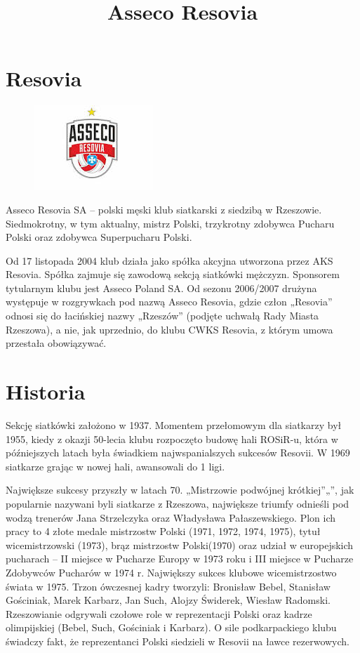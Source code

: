 \documentclass{article}
\title{Asseco Resovia}
\begin{document}
\maketitle    
\tableofcontents    
\newpage
                
\section{Resovia}
\label{obrazek}
\begin{figure}
\centering
\includegraphics{resovia.jpg}

\end{figure}

    Asseco Resovia SA – polski męski klub siatkarski z siedzibą w Rzeszowie. Siedmokrotny, w tym aktualny, mistrz Polski, trzykrotny zdobywca Pucharu Polski oraz zdobywca Superpucharu Polski.

Od 17 listopada 2004 klub działa jako spółka akcyjna utworzona przez AKS Resovia. Spółka zajmuje się zawodową sekcją siatkówki mężczyzn. Sponsorem tytularnym klubu jest Asseco Poland SA. Od sezonu 2006/2007 drużyna występuje w rozgrywkach pod nazwą Asseco Resovia, gdzie człon „Resovia” odnosi się do łacińskiej nazwy „Rzeszów” (podjęte uchwałą Rady Miasta Rzeszowa), a nie, jak uprzednio, do klubu CWKS Resovia, z którym umowa przestała obowiązywać.

\section{Historia}
Sekcję siatkówki założono w 1937. Momentem przełomowym dla siatkarzy był 1955, kiedy z okazji 50-lecia klubu rozpoczęto budowę hali ROSiR-u, która w późniejszych latach była świadkiem najwspanialszych sukcesów Resovii. W 1969 siatkarze grając w nowej hali, awansowali do 1 ligi.

Największe sukcesy przyszły w latach 70. „Mistrzowie podwójnej krótkiej”„”, jak popularnie nazywani byli siatkarze z Rzeszowa, największe triumfy odnieśli pod wodzą trenerów Jana Strzelczyka oraz Władysława Pałaszewskiego. Plon ich pracy to 4 złote medale mistrzostw Polski (1971, 1972, 1974, 1975), tytuł wicemistrzowski (1973), brąz mistrzostw Polski(1970) oraz udział w europejskich pucharach – II miejsce w Pucharze Europy w 1973 roku i III miejsce w Pucharze Zdobywców Pucharów w 1974 r. Największy sukces klubowe wicemistrzostwo świata w 1975. Trzon ówczesnej kadry tworzyli: Bronisław Bebel, Stanisław Gościniak, Marek Karbarz, Jan Such, Alojzy Świderek, Wiesław Radomski. Rzeszowianie odgrywali czołowe role w reprezentacji Polski oraz kadrze olimpijskiej (Bebel, Such, Gościniak i Karbarz). O sile podkarpackiego klubu świadczy fakt, że reprezentanci Polski siedzieli w Resovii na ławce rezerwowych.
\end{document}
